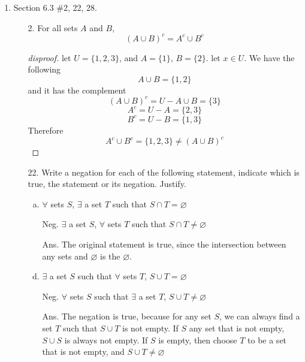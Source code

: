 \documentclass[12pt]{article}
\newcommand{\paren}[1]{\left( #1 \right)}
\begin{document}
\begin{enumerate}

\item Section 6.3 \#2, 22, 28.
    \begin{enumerate}
        \item[2.] For all sets $A$ and $B$,
            \[
            \paren{A \cup B}^c = A^c \cup B^c
            \]
            \begin{proof}[disproof]
            let $U = \{1,2,3\}$, and $A = \{1\}$, $B = \{2\}$. let $x \in U$. We have the following
            \[
            A \cup B = \{1,2\}
            \]
            and it has the complement
            \[
            \paren{A \cup B}^c = U - A \cup B = \{3\}
            \]
            \[
            A^c = U - A = \{2,3\}
            \]
            \[
            B^c = U - B = \{1,3\}
            \]
            Therefore 
            \[
            A^c \cup B^c = \{1,2,3\} \neq \paren{A \cup B}^c
            \]
                
            \end{proof}

            \item[22.] Write a negation for each of the following statement, indicate which is true, the statement or its negation. Justify.
                \begin{enumerate}[a.]
                    \item $\forall$ sets $S$, $\exists$ a set $T$ such that $S \cap T = \varnothing$
                    \item[Neg.]$\exists$ a set $S$, $\forall$ sets $T$ such that $S\cap T \neq \varnothing$\\
                    \item[Ans.] The original statement is true, since the intersection between any sets and $\varnothing$ is the $\varnothing$.
                    \item $\exists$ a set $S$ such that $\forall$ sets $T$, $S \cup T = \varnothing$
                    \item[Neg.]$\forall$ sets $S$ such that $\exists$ a set $T$, $S \cup T \neq \varnothing$
                    \item[Ans.] The negation is true, because for any set $S$, we can always find a set $T$ such that $S \cup T$ is not empty. If $S$ any set that is not empty, $S \cup S$ is always not empty. If $S$ is empty, then choose $T$ to be a set that is not empty, and $S \cup T \neq \varnothing$
                \end{enumerate}


\end{enumerate}
\end{enumerate}
\end{document}
